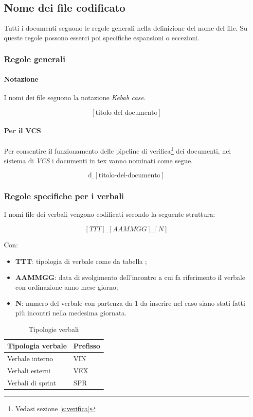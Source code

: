 \subsection{Nome dei file codificato}

Tutti i documenti seguono le regole generali nella definizione del nome del file. Su queste regole possono esserci poi specifiche espansioni o eccezioni.

\subsubsection{Regole generali}
\paragraph{Notazione}I nomi dei file seguono la notazione \textit{Kebab case}.

\[[\text{titolo-del-documento}]\]

\paragraph{Per il VCS} Per consentire il funzionamento delle pipeline di verifica\footnote{Vedasi sezione \ref{s:verifica}} dei documenti, nel sistema di \textit{VCS} i documenti in tex vanno nominati come segue.

\[\text{d}\_[\text{titolo-del-documento}]\]

\subsubsection{Regole specifiche per i verbali}
I nomi file dei verbali vengono codificati secondo la seguente struttura:

\[[TTT]\_[AAMMGG]\_[N]\]

Con:
\begin{itemize}
    \item \textbf{TTT}: tipologia di verbale come da tabella  ;
    \item \textbf{AAMMGG}: data di svolgimento dell'incontro a cui fa riferimento il verbale con ordinazione anno mese giorno;
    \item \textbf{N}: numero del verbale con partenza da 1 da inserire nel caso siano stati fatti più incontri nella medesima giornata.
\end{itemize}

\begin{table}[h]
    \centering
    \begin{tabularx}{0.7\linewidth}{X | l}
        \textbf{Tipologia verbale} & \textbf{Prefisso}\\
        \hline
        Verbale interno & VIN \\
        Verbali esterni & VEX\\
        Verbali di sprint & SPR \\
    \end{tabularx}
    \caption{Tipologie verbali}
    \label{table:t_verbali}
\end{table}



